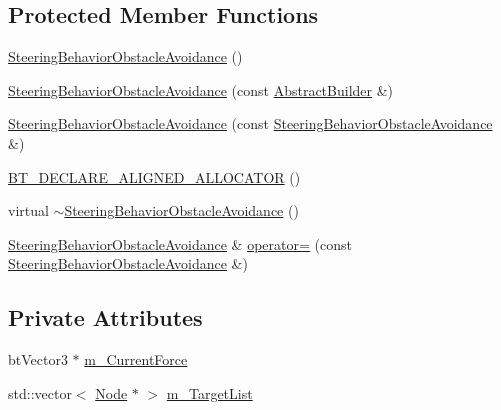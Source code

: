 \subsection*{Protected Member Functions}
\begin{DoxyCompactItemize}
\item 
\mbox{\hyperlink{classnjli_1_1_steering_behavior_obstacle_avoidance_adad91d1481840efe2a068f51e8153c5e}{Steering\+Behavior\+Obstacle\+Avoidance}} ()
\item 
\mbox{\hyperlink{classnjli_1_1_steering_behavior_obstacle_avoidance_afb7233b928e792ad233f31d3df58fdcb}{Steering\+Behavior\+Obstacle\+Avoidance}} (const \mbox{\hyperlink{classnjli_1_1_abstract_builder}{Abstract\+Builder}} \&)
\item 
\mbox{\hyperlink{classnjli_1_1_steering_behavior_obstacle_avoidance_a89e724ab07864170b8f232120ed5172a}{Steering\+Behavior\+Obstacle\+Avoidance}} (const \mbox{\hyperlink{classnjli_1_1_steering_behavior_obstacle_avoidance}{Steering\+Behavior\+Obstacle\+Avoidance}} \&)
\item 
\mbox{\hyperlink{classnjli_1_1_steering_behavior_obstacle_avoidance_a26cd4fa32497194145cc2f1a931019d7}{B\+T\+\_\+\+D\+E\+C\+L\+A\+R\+E\+\_\+\+A\+L\+I\+G\+N\+E\+D\+\_\+\+A\+L\+L\+O\+C\+A\+T\+OR}} ()
\item 
virtual \mbox{\hyperlink{classnjli_1_1_steering_behavior_obstacle_avoidance_ac9be3aa16312cbfb6dc7632d66834fc9}{$\sim$\+Steering\+Behavior\+Obstacle\+Avoidance}} ()
\item 
\mbox{\hyperlink{classnjli_1_1_steering_behavior_obstacle_avoidance}{Steering\+Behavior\+Obstacle\+Avoidance}} \& \mbox{\hyperlink{classnjli_1_1_steering_behavior_obstacle_avoidance_aee0cca003e0d184762ef89d4adda8278}{operator=}} (const \mbox{\hyperlink{classnjli_1_1_steering_behavior_obstacle_avoidance}{Steering\+Behavior\+Obstacle\+Avoidance}} \&)
\end{DoxyCompactItemize}
\subsection*{Private Attributes}
\begin{DoxyCompactItemize}
\item 
bt\+Vector3 $\ast$ \mbox{\hyperlink{classnjli_1_1_steering_behavior_obstacle_avoidance_a0da00761f1753d9fcadf6870cb70ebfd}{m\+\_\+\+Current\+Force}}
\item 
std\+::vector$<$ \mbox{\hyperlink{classnjli_1_1_node}{Node}} $\ast$ $>$ \mbox{\hyperlink{classnjli_1_1_steering_behavior_obstacle_avoidance_a31b86ef77f3be59af3613d48b8ed073b}{m\+\_\+\+Target\+List}}
\end{DoxyCompactItemize}
